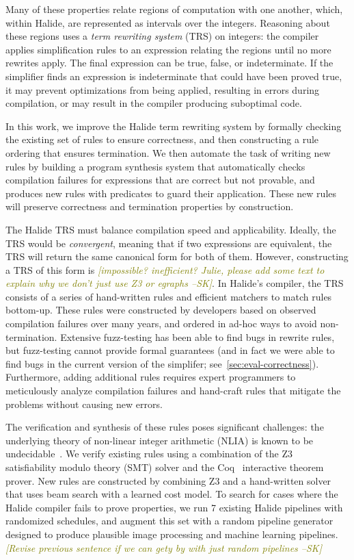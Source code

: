\documentclass[sigplan,10pt,review,anonymous]{acmart}\settopmatter{printfolios=true,printccs=false,printacmref=false}
\newcommand{\sak}[1]{\textcolor{olive}{\textit{[{#1} --SK]}}}
\newcommand{\NumApps}{{\color{red} 7}\xspace}
\begin{document}
Many of these properties relate regions of computation with one another,
which, within Halide, are represented as intervals over the integers.
Reasoning about these regions uses a \textit{term rewriting system}
(TRS) on integers: the compiler applies simplification rules to an expression relating
the regions until no more rewrites apply.  The final expression can be
true, false, or indeterminate.  If the simplifier finds an expression is indeterminate that
could have been proved true, it may prevent optimizations
from being applied, resulting in errors during compilation, or may result
in the compiler producing suboptimal code.

In this work, we improve the Halide term rewriting system by formally checking the existing
set of rules to ensure correctness, and then constructing a rule ordering that 
ensures termination.  We then automate the task of writing new rules by building a program
synthesis system that automatically checks compilation failures for expressions that are
correct but not provable, and produces new rules with predicates to guard their application.
These new rules will preserve correctness and termination properties by construction.

The Halide TRS must balance compilation speed and applicability. 
Ideally, the TRS would be \emph{convergent}, meaning that if two expressions are equivalent,
the TRS will return the same canonical form for both of them.
However, constructing a TRS of this form
is \sak{impossible? inefficient? Julie, please add some text to explain why we don't just
use Z3 or egraphs}.  In Halide's compiler, the TRS consists of a series of
hand-written rules and efficient matchers to match rules bottom-up.  These rules were constructed
by developers based on observed compilation failures over many years, and ordered in ad-hoc ways
to avoid non-termination.  Extensive fuzz-testing has been able to find bugs in rewrite rules,
but fuzz-testing cannot provide formal guarantees (and in fact we were able to find bugs in the current version of the simplifer; see~\ref{sec:eval-correctness}). Furthermore, adding additional
rules requires expert programmers to meticulously analyze compilation failures and hand-craft
rules that mitigate the problems without causing new errors.

The verification and synthesis
of these rules poses significant challenges: the underlying theory of non-linear integer arithmetic (NLIA)
is known to be undecidable~\cite{matiyasevich1993hilberts10th}. We verify
existing rules using a combination of the Z3~\cite{de2008z3} satisfiability
modulo theory (SMT) solver and the Coq~\cite{coq19} interactive theorem prover. 
New rules are constructed by combining Z3 and a hand-written solver that uses beam
search with a learned cost model. To search for cases where the Halide compiler
fails to prove properties, we run \NumApps existing Halide pipelines with
randomized schedules, and augment this set with a random pipeline generator
designed to produce plausible image processing and machine learning pipelines.
\sak{Revise previous sentence if we can gety by with just random pipelines}
\end{document}
